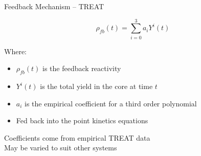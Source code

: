 \begin{frame}{Feedback Mechanism -- TREAT}


{\Large \[\rho_{fb}(t) = \sum_{i = 0}^{3}a_i Y^i (t) \] }

{Where:}

\begin{itemize}
    \item $\rho_{fb}(t)$ is the feedback reactivity
    \item $Y^i (t)$ is the total yield in the core at time $t$
    \item $a_i$ is the empirical coefficient for a third order polynomial
    \item Fed back into the point kinetics equations
\end{itemize}

\begin{block}{}
Coefficients come from empirical TREAT data\\
May be varied to suit other systems
\end{block}

\end{frame}